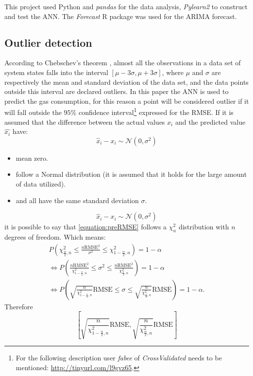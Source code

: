 \documentclass{sig-alternate-sigmod07}
\begin{document}
This project used Python and \emph{pandas} for the data analysis, \emph{Pylearn2} \cite{goodfellow2013pylearn2} to construct and test the ANN. The \emph{Forecast} \cite{hyndman2007automatic} R package was used for the ARIMA forecast. 




\subsection{Outlier detection}
\label{sec:outlierDetection}

According to Chebschev's theorem \cite{amidan2005data}, almost all the observations in a data set of system states falls into the interval $[\mu - 3\sigma, \mu+3\sigma]$, where $\mu$ and $\sigma$ are respectively the mean and standard deviation of the data set, and the data points outside this interval are declared outliers. In this paper the ANN is used to predict the gas consumption, for this reason a point will be considered outlier if it will fall outside the $95\%$ confidence interval\footnote{For the following description user \textit{fabee} of \emph{CrossValidated} needs to be mentioned: \url{http://tinyurl.com/l9gvz65}. } expressed for the RMSE. If it is assumed that the difference between the actual values $x_i$ and the predicted value $\hat{x_i}$ have:
\begin{equation}
\hat{x}_{i}-x_{i}	\sim	\mathcal{N}\left(0,\sigma^{2}\right)
\end{equation}
\begin{itemize}
\itemsep0em
  \item mean zero.
  \item follow a Normal distribution (it is assumed that it holds for the large amount of data utilized).
  \item and all have the same standard deviation $\sigma$.
\end{itemize}
\begin{equation}
\label{equation:preRMSE}
\hat{x}_{i}-x_{i}	\sim	\mathcal{N}\left(0,\sigma^{2}\right)
\end{equation}
it is possible to say that \cref{equation:preRMSE} follows a $\chi_{n}^{2}$ distribution with $n$ degrees of freedom. Which means:
\begin{align}
P\left(\chi_{\frac{\alpha}{2},n}^{2}\le\frac{n\mbox{RMSE}^{2}}{\sigma^{2}}\le\chi_{1-\frac{\alpha}{2},n}^{2}\right)	=	1-\alpha\\
\Leftrightarrow P\left(\frac{n\mbox{RMSE}^{2}}{\chi_{1-\frac{\alpha}{2},n}^{2}}\le\sigma^{2}\le\frac{n\mbox{RMSE}^{2}}{\chi_{\frac{\alpha}{2},n}^{2}}\right)	=	1-\alpha\\
\Leftrightarrow P\left(\sqrt{\frac{n}{\chi_{1-\frac{\alpha}{2},n}^{2}}}\mbox{RMSE}\le\sigma\le\sqrt{\frac{n}{\chi_{\frac{\alpha}{2},n}^{2}}}\mbox{RMSE}\right)	=	1-\alpha.
\end{align}
Therefore
\begin{equation}
\left[\sqrt{\frac{n}{\chi_{1-\frac{\alpha}{2},n}^{2}}}\mbox{RMSE},\sqrt{\frac{n}{\chi_{\frac{\alpha}{2},n}^{2}}}\mbox{RMSE}\right]
\end{equation}
\end{document}
